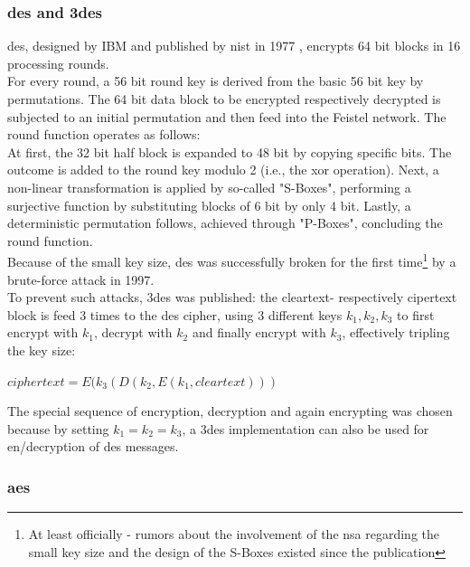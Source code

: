 \subsubsection{\gls{des} and \gls{3des}}
\gls{des}, designed by IBM and published by \gls{nist} in 1977 \cite{des}, encrypts 64 bit blocks in 16 processing rounds.
\\
For every round, a 56 bit round key is derived from the basic 56 bit
key by permutations. The 64 bit data block to be encrypted respectively decrypted is subjected to an initial permutation and then feed into the Feistel
network. The round function operates as follows:
\\
At first, the 32 bit half block is expanded to 48 bit by copying specific bits. The outcome is added to the round key modulo 2 (i.e., the \gls{xor} operation).
Next, a non-linear transformation is applied by so-called "S-Boxes", performing a surjective function by substituting blocks of 6 bit by only
4 bit. Lastly, a deterministic permutation follows, achieved through "P-Boxes", concluding the round
function.
\\
Because of the small key size, \gls{des} was successfully broken for the first time\footnote{At least officially - rumors about the involvement of the \gls{nsa}
regarding the small key size and the design of the S-Boxes existed since the publication} by a brute-force attack in 1997.
\\
To prevent such attacks, \gls{3des} was published: the cleartext- respectively 
cipertext block is feed 3 times to the \gls{des} cipher, using 3 different keys $k_1, k_2, k_3$ to first encrypt with $k_1$, decrypt with $k_2$ and finally 
encrypt with $k_3$, effectively tripling the key size:
\begin{center}
 $ciphertext = E(k_3(D(k_2,E(k_1, cleartext)))$
\end{center}
The special sequence of encryption, decryption and again encrypting was chosen because by setting $k_1 = k_2 = k_3$, a \gls{3des} implementation can also be used
for en/decryption of \gls{des} messages.

\subsubsection{\gls{aes}}

